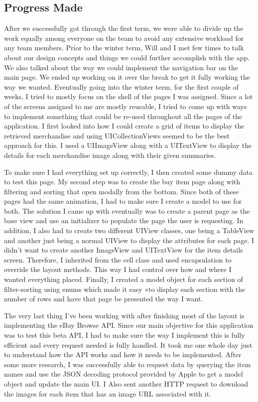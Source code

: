 \documentclass[onecolumn, draftclsnofoot,10pt, compsoc]{IEEEtran}
\begin{document}
\subsection{Progress Made}
\par After we successfully got through the first term, we were able to divide up the work equally among everyone on the team to avoid any extensive workload for any team members. Prior to the winter term, Will and I met few times to talk about our design concepts and things we could further accomplish with the app. We also talked about the way we could implement the navigation bar on the main page. We ended up working on it over the break to get it fully working the way we wanted. Eventually going into the winter term, for the first couple of weeks, I tried to mostly focus on the shell of the pages I was assigned. Since a lot of the screens assigned to me are mostly reusable, I tried to come up with ways to implement something that could be re-used throughout all the pages of the application. I first looked into how I could create a grid of items to display the retrieved merchandise and using UICollectionViews seemed to be the best approach for this. I used a UIImageView along with a UITextView to display the details for each merchandise image along with their given summaries. 
\par To make sure I had everything set up correctly, I then created some dummy data to test this page. My second step was to create the buy item page along with filtering and sorting that open modally from the bottom. Since both of these pages had the same animation, I had to make sure I create a model to use for both. The solution I came up with eventually was to create a parent page as the base view and use an initializer to populate the page the user is requesting. In addition, I also had to create two different UIView classes, one being a TableView and another just being a normal UIView to display the attributes for each page. I didn't want to create another ImageView and UITextView for the item details screen. Therefore, I inherited from the cell class and used encapsulation to override the layout methods. This way I had control over how and where I wanted everything placed. Finally, I created a model object for each section of filter-sorting using enums which made it easy «to display each section with the number of rows and have that page be presented the way I want. 
\par The very last thing I’ve been working with after finishing most of the layout is implementing the eBay Browse API. Since our main objective for this application was to test this beta API, I had to make sure the way I implement this is fully efficient and every request needed is fully handled. It took me one whole day just to understand how the API works and how it needs to be implemented. After some more research, I was successfully able to request data by querying the item names and use the JSON decoding protocol provided by Apple to get a model object and update the main UI. I Also sent another HTTP request to download the images for each item that has an image URL associated with it.
\end{document}
